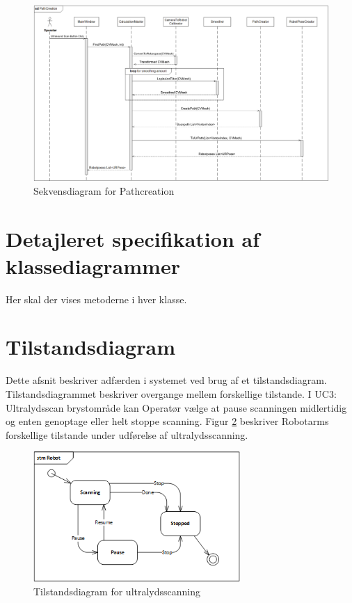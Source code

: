 \begin{figure}[H]
    \centering
    \includegraphics[width=1.2\textwidth, angle =90]{figurer/d/Design/Sequence/sd_ultrascan}
    \caption{Sekvensdiagram for Pathcreation}
    \label{sd_ultrascan}
\end{figure}
\newpage

\section{Detajleret specifikation af klassediagrammer}
Her skal der vises metoderne i hver klasse. 

\section{Tilstandsdiagram}
Dette afsnit beskriver adfærden i systemet ved brug af et tilstandsdiagram. Tilstandsdiagrammet beskriver overgange mellem forskellige tilstande. I UC3: Ultralydsscan brystområde kan Operatør vælge at pause scanningen midlertidig og enten genoptage eller helt stoppe scanning. Figur \ref{stm_Ultra} beskriver Robotarms forskellige tilstande under udførelse af ultralydsscanning. 

\begin{figure}[H]
    \centering
    \includegraphics[width=0.7\textwidth]{figurer/d/Design/stm_UC3}
    \caption{Tilstandsdiagram for ultralydsscanning}
    \label{stm_Ultra}
\end{figure}

